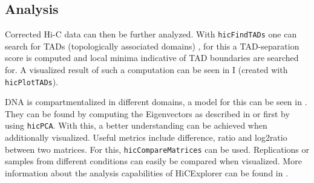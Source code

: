 


\subsection{Analysis}\label{sec:analysis}

Corrected Hi-C data can then be further analyzed. With \verb|hicFindTADs| one
can search for TADs (topologically associated domains) \cite{ramirez2018high},
for this a TAD-separation score is computed and local minima indicative of TAD
boundaries are searched for. A visualized result of such a computation can be
seen in I (created with \verb|hicPlotTADs|).

DNA is compartmentalized \cite{lieberman2009comprehensive} in different
domains, a model for this can be seen in . They
can be found by computing the Eigenvectors as described in
\cite{lieberman2009comprehensive} or \cite{imakaev2012iterative} first by using
\verb|hicPCA|. With this, a better understanding can be achieved when
additionally visualized. Useful metrics include difference, ratio and log2ratio
between two matrices. For this, \verb|hicCompareMatrices| can be used.
Replications or samples from different conditions can easily be compared when
visualized. More information about the analysis capabilities of HiCExplorer can
be found in \cite{wolff2018galaxy}.

%
%
%
%


